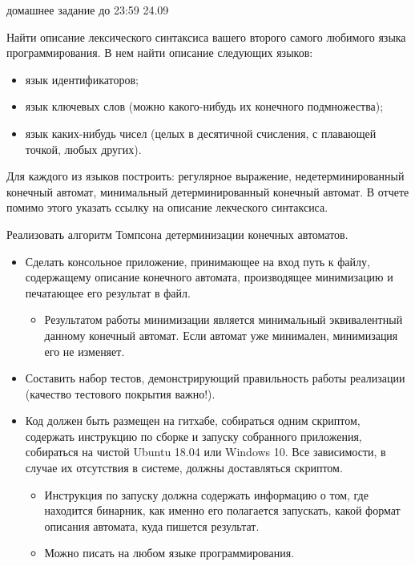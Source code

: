 \documentclass[12pt]{article}
\begin{document}

{\Large домашнее задание до 23:59 24.09}
\bigskip

\enumerate
{
  \item Найти описание лексического синтаксиса вашего второго самого любимого языка программирования. В нем найти описание следующих языков:  
  \begin{itemize} 
      \item язык идентификаторов;
      \item язык ключевых слов (можно какого-нибудь их конечного подмножества);
      \item язык каких-нибудь чисел (целых в десятичной счисления, с плавающей точкой, любых других).
  \end{itemize}
    Для каждого из языков построить: регулярное выражение, недетерминированный конечный автомат, минимальный детерминированный конечный автомат. В отчете помимо этого указать ссылку на описание лекческого синтаксиса.
  \item 
  {
    Реализовать алгоритм Томпсона детерминизации конечных автоматов. 
        \begin{itemize}
        \item Сделать консольное  приложение, принимающее на вход путь к файлу, содержащему описание конечного автомата, производящее минимизацию и печатающее его результат в файл.
        \begin{itemize}
            \item Результатом работы минимизации является минимальный эквивалентный данному конечный автомат. Если автомат уже минимален, минимизация его не изменяет.
        \end{itemize}
        \item Составить набор тестов, демонстрирующий правильность работы реализации (качество тестового покрытия важно!).
        \item Код должен быть размещен на гитхабе, собираться одним скриптом, содержать инструкцию по сборке и запуску собранного приложения, собираться на чистой Ubuntu 18.04 или Windows 10. Все зависимости, в случае их отсутствия в системе, должны доставляться скриптом.
        \begin{itemize}
            \item Инструкция по запуску должна содержать информацию о том, где находится бинарник, как именно его полагается запускать, какой формат описания автомата, куда пишется результат.
            \item Можно писать на любом языке программирования. 
        \end{itemize} 
     \end{itemize}
  }

}
\end{document}
